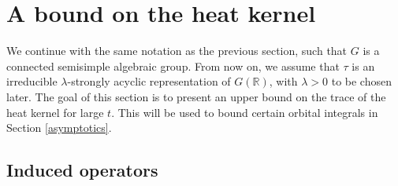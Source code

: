 \documentclass[11pt,reqno]{amsart}
\numberwithin{equation}{section}
\theoremstyle{definition}
\theoremstyle{remark}
\newcommand{\R}{\mathbb{R}}
\begin{document}
\bigskip

\section{A bound on the heat kernel}\label{plancherel}
\noindent We continue with the same notation as the previous section, such that $G$ is a connected semisimple algebraic group. From now on, we assume that $\tau$ is an irreducible $\lambda$-strongly acyclic representation of $G(\R)$, with $\lambda>0$ to be chosen later. The goal of this section is to present an upper bound on the trace of the heat kernel for large $t$. This will be used to bound certain orbital integrals in Section \ref{asymptotics}.

\subsection*{Induced operators}
\end{document}
